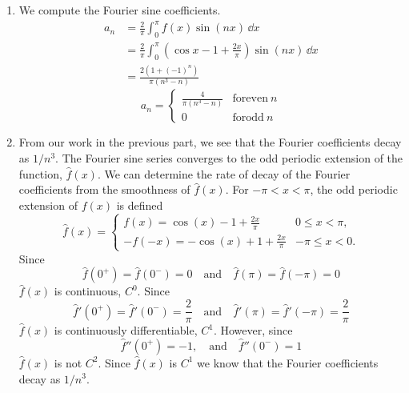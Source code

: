 {%
\begin{Solution}
  \begin{enumerate}
  \item 
    We compute the Fourier sine coefficients.
    \begin{align*}
      a_n 
      &= \frac{2}{\pi} \int_0^\pi f(x) \sin(n x) \,\dd x \\
      &= \frac{2}{\pi} \int_0^\pi 
      \left( \cos x - 1 + \frac{2 x}{\pi} \right) \sin(n x) \,\dd x \\
      &= \frac{2 (1 + (-1)^n)}{\pi (n^3 - n)}
    \end{align*}
    \[
    \boxed{
      a_n = 
      \begin{cases}
        \frac{4}{\pi (n^3 - n)} &\mathrm{for even}\ n \\
        0 &\mathrm{for odd}\ n
      \end{cases}
      }
    \]
  \item 
    From our work in the previous part, we see that the Fourier coefficients
    decay as $1/n^3$. The Fourier sine series converges to the odd periodic 
    extension of the function, $\hat{f}(x)$.  We can determine the rate 
    of decay of the Fourier
    coefficients from the smoothness of $\hat{f}(x)$.
    For $-\pi < x < \pi$, the odd periodic extension of $f(x)$ is defined
    \[
    \hat{f}(x) = \begin{cases}
      f(x) = \cos(x) - 1 + \frac{2 x}{\pi} &0 \leq x < \pi, \\
      -f(-x) = - \cos(x) + 1 + \frac{2 x}{\pi} &-\pi \leq x < 0.
    \end{cases}
    \]
    Since 
    \[
    \hat{f}(0^+) = \hat{f}(0^-) = 0 
    \quad \mathrm{and} \quad
    \hat{f}(\pi) = \hat{f}(-\pi) = 0
    \]
    $\hat{f}(x)$ is continuous, $C^0$.  Since
    \[
    \hat{f}'(0^+) = \hat{f}'(0^-) = \frac{2}{\pi} 
    \quad \mathrm{and} \quad
    \hat{f}'(\pi) = \hat{f}'(- \pi) = \frac{2}{\pi}
    \]
    $\hat{f}(x)$ is continuously differentiable, $C^1$.  However, since
    \[
    \hat{f}''(0^+) = -1, 
    \quad \mathrm{and} \quad
    \hat{f}''(0^-) = 1
    \]
    $\hat{f}(x)$ is not $C^2$.
    Since $\hat{f}(x)$ is $C^1$ we know that the Fourier coefficients decay
    as $1 / n^3$.
  \end{enumerate}
\end{Solution}





}
